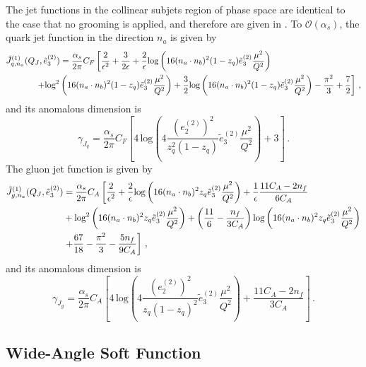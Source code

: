 \documentclass[a4paper,11pt]{article}
\newcommand{\ecf}[2]{e_{#1}^{(#2)}}
\newcommand{\ecflp}[2]{\tilde e_{#1}^{(#2)}}
\def\log{\text{log}}
\newcommand{\nn}{\nonumber}
\begin{document}
The jet functions in the collinear subjets region of phase space are identical to the case that no grooming is applied, and therefore are given in \cite{Larkoski:2015kga}. To $\mathcal{O}(\alpha_s)$, the quark jet function in the direction $n_a$ is given by
\begin{align}\label{eq:qjet_final}
\tilde{J}_{q,n_{a}}^{(1)} (Q_J,\ecflp{3}{2})&=\frac{\alpha_s}{2\pi}C_F\left[\frac{2}{\epsilon^2}+\frac{3}{2\epsilon}+\frac{2}{\epsilon}   \log\left( 16(n_a\cdot n_b)^2(1-z_q) \ecflp{3}{2}\frac{\mu^2}{Q^2}  \right)\right.\\
&
\hspace{-1cm}
\left.+\log^2\left( 16(n_a\cdot n_b)^2(1-z_q) \ecflp{3}{2}\frac{\mu^2}{Q^2}  \right)+\frac{3}{2}\log\left( 16(n_a\cdot n_b)^2(1-z_q) \ecflp{3}{2}\frac{\mu^2}{Q^2}  \right)-\frac{\pi^2}{3}+\frac{7}{2}\right] \,,\nonumber
\end{align}
and its anomalous dimension is 
\begin{equation}
\gamma_{J_q} = \frac{\alpha_s}{2\pi}C_F\left[
4\,  \log\left( 4\frac{\left(\ecf{2}{2}\right)^2}{z_q^2(1-z_q)}\ecflp{3}{2}\frac{\mu^2}{Q^2}  \right)+3
\right]\,.
\end{equation}
The gluon jet function is given by
\begin{align}\label{eq:gjet_final}
\tilde{J}_{g,n_{a}}^{(1)}(Q_J,\ecflp{3}{2})&=\frac{\alpha_s}{2\pi}C_A\left[\frac{2}{\epsilon^2}   +\frac{2 }{ \epsilon}\log\left( 16(n_a\cdot n_b)^2 z_q \ecflp{3}{2}\frac{\mu^2}{Q^2}  \right)   +\frac{1}{ \epsilon} \frac{11C_A-2n_f}{6C_A}  \right. \nn\\
   &
    \hspace{-0.0cm}
    + \log^2\left( 16(n_a\cdot n_b)^2 z_q \ecflp{3}{2}\frac{\mu^2}{Q^2}  \right)+\left(
    \frac{11}{6}-\frac{n_f}{3C_A}
    \right)\log\left( 16(n_a\cdot n_b)^2 z_q \ecflp{3}{2}\frac{\mu^2}{Q^2}  \right)
    \nonumber \\
   &
   \left.
   \hspace{-0.0cm}
   +\frac{67}{18}-\frac{\pi^2}{3}-\frac{5 n_f}{9 C_A }\right]\,,
\end{align}
and its anomalous dimension is
\begin{equation}
\gamma_{J_g} = \frac{\alpha_s}{2\pi}C_A\left[
4\,  \log\left( 4\frac{\left(\ecf{2}{2}\right)^2}{z_q(1-z_q)^2} \ecflp{3}{2}\frac{\mu^2}{Q^2}  \right)+\frac{11C_A-2n_f}{3C_A}
\right]\,.
\end{equation}


\subsection{Wide-Angle Soft Function}\label{app:softanom}
\end{document}
